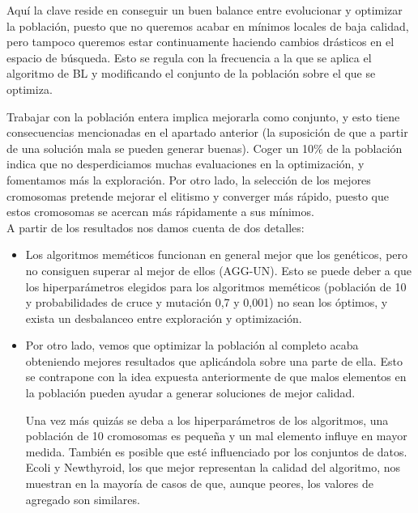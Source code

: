 Aquí la clave reside en conseguir un buen balance entre evolucionar y optimizar la población, puesto que no queremos acabar en mínimos locales de baja calidad, pero tampoco queremos estar continuamente haciendo cambios drásticos en el espacio de búsqueda. Esto se regula con la frecuencia a la que se aplica el algoritmo de BL y modificando el conjunto de la población sobre el que se optimiza.

Trabajar con la población entera implica mejorarla como conjunto, y esto tiene consecuencias mencionadas en el apartado anterior (la suposición de que a partir de una solución mala se pueden generar buenas).
Coger un 10\% de la población indica que no desperdiciamos muchas evaluaciones en la optimización, y fomentamos más la exploración. Por otro lado, la selección de los mejores cromosomas pretende mejorar el elitismo y converger más rápido, puesto que estos cromosomas se acercan más rápidamente a sus mínimos. \\

A partir de los resultados nos damos cuenta de dos detalles:
\begin{itemize}
    \item Los algoritmos meméticos funcionan en general mejor que los genéticos, pero no consiguen superar al mejor de ellos (AGG-UN). Esto se puede deber a que los hiperparámetros elegidos para los algoritmos meméticos (población de 10 y probabilidades de cruce y mutación 0,7 y 0,001) no sean los óptimos, y exista un desbalanceo entre exploración y optimización.
    \item Por otro lado, vemos que optimizar la población al completo acaba obteniendo mejores resultados que aplicándola sobre una parte de ella. Esto se contrapone con la idea expuesta anteriormente de que malos elementos en la población pueden ayudar a generar soluciones de mejor calidad. 
    
    Una vez más quizás se deba a los hiperparámetros de los algoritmos, una población de 10 cromosomas es pequeña y un mal elemento influye en mayor medida. También es posible que esté influenciado por los conjuntos de datos. Ecoli y Newthyroid, los que mejor representan la calidad del algoritmo, nos muestran en la mayoría de casos de que, aunque peores, los valores de agregado son similares. 
\end{itemize}


